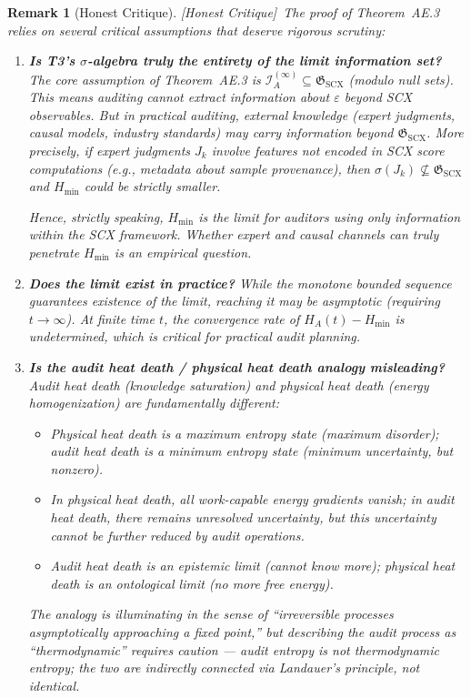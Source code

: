 \documentclass[12pt,a4paper]{article}
\newtheorem{remark}[theorem]{Remark}
\newcommand{\hcritique}{\textcolor{blue!60!black}{\small\textsf{[Honest Critique]}}}
\newcommand{\cI}{\mathcal{I}}
\newcommand{\sG}{\mathfrak{G}}
\begin{document}
\begin{remark}[Honest Critique]
\label{crit:ae3}
\hcritique~The proof of Theorem~AE.3 relies on several critical assumptions that deserve rigorous scrutiny:
\begin{enumerate}
    \item \textbf{Is T3's $\sigma$-algebra truly the entirety of the limit information set?}
    The core assumption of Theorem~AE.3 is $\cI_A^{(\infty)} \subseteq \sG_{\mathrm{SCX}}$ (modulo null sets). This means auditing cannot extract information about $\varepsilon$ beyond SCX observables. But in practical auditing, external knowledge (expert judgments, causal models, industry standards) may carry information beyond $\sG_{\mathrm{SCX}}$. More precisely, if expert judgments $J_k$ involve features not encoded in SCX score computations (e.g., metadata about sample provenance), then $\sigma(J_k) \not\subseteq \sG_{\mathrm{SCX}}$ and $H_{\min}$ could be strictly smaller.

    Hence, strictly speaking, $H_{\min}$ is the limit for auditors using \emph{only information within the SCX framework}. Whether expert and causal channels can truly penetrate $H_{\min}$ is an empirical question.

    \item \textbf{Does the limit exist in practice?}
    While the monotone bounded sequence guarantees existence of the limit, reaching it may be asymptotic (requiring $t\to\infty$). At finite time $t$, the convergence rate of $H_A(t) - H_{\min}$ is undetermined, which is critical for practical audit planning.

    \item \textbf{Is the audit heat death / physical heat death analogy misleading?}
    Audit heat death (knowledge saturation) and physical heat death (energy homogenization) are fundamentally different:
    \begin{itemize}
        \item Physical heat death is a \emph{maximum entropy} state (maximum disorder); audit heat death is a \emph{minimum entropy} state (minimum uncertainty, but nonzero).
        \item In physical heat death, all work-capable energy gradients vanish; in audit heat death, there remains unresolved uncertainty, but this uncertainty cannot be further reduced by audit operations.
        \item Audit heat death is an \emph{epistemic} limit (cannot know more); physical heat death is an \emph{ontological} limit (no more free energy).
    \end{itemize}
    The analogy is illuminating in the sense of ``irreversible processes asymptotically approaching a fixed point,'' but describing the audit process as ``thermodynamic'' requires caution --- audit entropy is not thermodynamic entropy; the two are indirectly connected via Landauer's principle, not identical.
\end{enumerate}
\end{remark}
\end{document}
